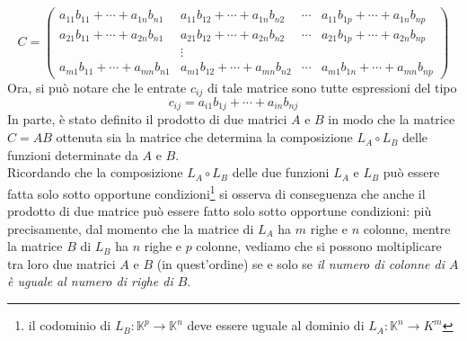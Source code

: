 \begin{equation}
  \label{eq:Compinveeproddimatrici4}
  C=
  \left(
    \begin{array}{cccc}
      a_{11}b_{11}+\cdots+a_{1n}b_{n1}& a_{11}b_{12}+\cdots+a_{1n}b_{n2}& \cdots & a_{11}b_{1p}+\cdots+a_{1n}
                                                                                   b_{np}\\
      a_{21}b_{11}+\cdots+a_{2n}b_{n1} & a_{21}b_{12}+\cdots+a_{2n}b_{n2}& \cdots & a_{21}b_{1p}+\cdots+a_{2n}
                                                                                    b_{np}\\
                                      & \vdots\\
      a_{m1}b_{11}+\cdots+a_{mn}b_{n1} & a_{m1}b_{12}+\cdots+a_{mn}b_{n2} & \cdots & a_{m1}b_{1n}+\cdots+a_{mn}
                                                                                     b_{np}
    \end{array}
  \right)
\end{equation}
Ora, si può notare che le entrate $c_{ij}$ di tale matrice sono tutte espressioni del tipo
\begin{equation}
  \label{eq:Compinveeproddimatrici5}
  c_{ij}=a_{i1}b_{1j}+\cdots+a_{in} b_{nj}
\end{equation}
In parte, è stato definito il prodotto di due matrici $A$ e $B$ in modo che la matrice $C=AB$ ottenuta sia
la matrice che determina la composizione $L_A\circ L_B$ delle funzioni determinate da $A$ e $B$.\\
Ricordando che la composizione $L_A\circ L_B$ delle due funzioni $L_A$ e $L_B$ può essere fatta solo sotto
opportune condizioni\footnote{il codominio di $L_B:\mathds{K}^p\to\mathds{K}^n$ deve essere uguale al dominio
  di $L_A:\mathds{K}^n\to K^m$} si osserva di conseguenza che anche il prodotto di due matrice può essere
fatto solo sotto opportune condizioni: più precisamente, dal momento che la matrice di $L_A$ ha $m$ righe
e $n$ colonne, mentre la matrice $B$ di $L_B$ ha $n$ righe e $p$ colonne, vediamo che si possono moltiplicare
tra loro due matrici $A$ e $B$ (in quest'ordine) se e solo se \textit{il numero di colonne di $A$ è uguale
  al numero di righe di $B$}.
